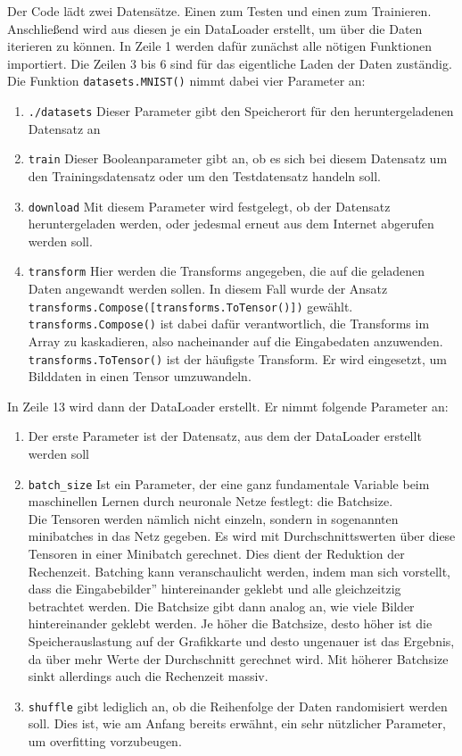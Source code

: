 \documentclass[11pt]{article}
\begin{document}
Der Code lädt zwei Datensätze. Einen zum Testen und einen zum Trainieren. Anschließend wird aus diesen je ein DataLoader erstellt, um über die Daten iterieren zu können. In Zeile 1 werden dafür zunächst alle nötigen Funktionen importiert. Die Zeilen 3 bis 6 sind für das eigentliche Laden der Daten zuständig.
Die Funktion \texttt{datasets.MNIST()} nimmt dabei vier Parameter an:
\begin{enumerate}
	\item \texttt{./datasets} Dieser Parameter gibt den Speicherort für den heruntergeladenen Datensatz an
	\item \texttt{train} Dieser Booleanparameter gibt an, ob es sich bei diesem Datensatz um den Trainingsdatensatz oder um den Testdatensatz handeln soll.
	\item \texttt{download} Mit diesem Parameter wird festgelegt, ob der Datensatz heruntergeladen werden, oder jedesmal erneut aus dem Internet abgerufen werden soll.
	\item \texttt{transform} Hier werden die Transforms angegeben, die auf die geladenen Daten angewandt werden sollen. In diesem Fall wurde der Ansatz\\ \texttt{transforms.Compose([transforms.ToTensor()])} gewählt.\\ \texttt{transforms.Compose()} ist dabei dafür verantwortlich, die Transforms im Array zu kaskadieren, also nacheinander auf die Eingabedaten anzuwenden. \\
	\texttt{transforms.ToTensor()} ist der häufigste Transform. Er wird eingesetzt, um Bilddaten in einen Tensor umzuwandeln.
\end{enumerate}
In Zeile 13 wird dann der DataLoader erstellt. Er nimmt folgende Parameter an:
\begin{enumerate}
	\item Der erste Parameter ist der Datensatz, aus dem der DataLoader erstellt werden soll
	\item \texttt{batch_size} Ist ein Parameter, der eine ganz fundamentale Variable beim maschinellen Lernen durch neuronale Netze festlegt: die Batchsize.\\
	Die Tensoren werden nämlich nicht einzeln, sondern in sogenannten minibatches in das Netz gegeben. Es wird mit Durchschnittswerten über diese Tensoren in einer Minibatch gerechnet. Dies dient der Reduktion der Rechenzeit. Batching kann veranschaulicht werden, indem man sich vorstellt, dass die \glqq Eingabebilder'' hintereinander geklebt und alle gleichzeitzig betrachtet werden. Die Batchsize gibt dann analog an, wie viele Bilder hintereinander geklebt werden. Je höher die Batchsize, desto höher ist die Speicherauslastung auf der Grafikkarte und desto ungenauer ist das Ergebnis, da über mehr Werte der Durchschnitt gerechnet wird. Mit höherer Batchsize sinkt allerdings auch die Rechenzeit massiv.
	\item \texttt{shuffle} gibt lediglich an, ob die Reihenfolge der Daten randomisiert werden soll. Dies ist, wie am Anfang bereits erwähnt, ein sehr nützlicher Parameter, um overfitting vorzubeugen.
\end{enumerate}
\end{document}

